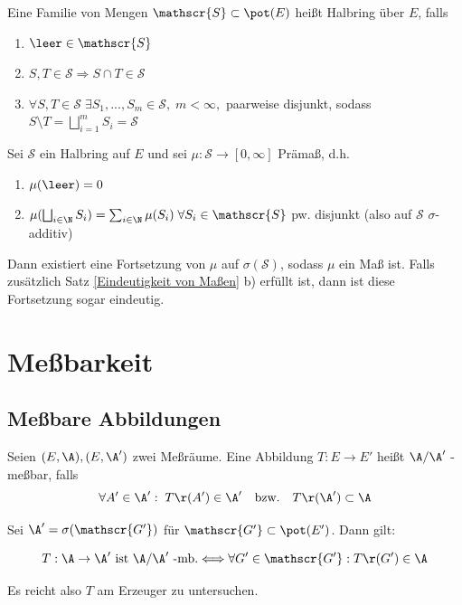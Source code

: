 \documentclass[11pt, a4paper]{article}
\begin{document}
\begin{definition} \label{def:Halbringe}
    Eine Familie von Mengen $\mathscr{S}\subset \pot(E)$ heißt Halbring über $E$, falls 
    \begin{enumerate}
        \item $\leer \in \mathscr{S}$
        \item $S,T\in \mathscr{S} \Rightarrow S\cap T\in \mathscr{S}$
        \item $\forall S,T\in \mathscr{S}\; \exists S_1,...,S_m\in \mathscr{S}, \; m<\infty,$ paarweise disjunkt, sodass $S\setminus T = \bigsqcup_{i=1}^m S_i = \mathscr{S}$
    \end{enumerate}
\end{definition}\bigskip

\begin{theorem}[Carathéodory] \Theorem
Sei $\mathscr{S}$ ein Halbring auf $E$ und sei $\mu: \mathscr{S}\to [0,\infty]$ Prämaß, d.h.
\begin{enumerate}[label = \alph*)]
    \item $\mu(\leer) = 0$
    \item $\mu(\bigsqcup_{i\in\N} S_i) = \sum_{i\in \N} \mu(S_i) \; \forall S_i\in \mathscr{S}$ pw. disjunkt (also auf $\mathscr{S}$ $\sigma$-additiv)
\end{enumerate}
Dann existiert eine Fortsetzung von $\mu$ auf $\sigma(\mathscr{S})$, sodass $\mu$ ein Maß ist. Falls zusätzlich Satz \ref{Eindeutigkeit von Maßen} b) erfüllt ist, dann ist diese Fortsetzung sogar eindeutig.
\end{theorem}




\newpage
\section{Meßbarkeit}

\subsection{Meßbare Abbildungen}
\begin{definition} \Theorem
    Seien $(E,\A), (E,\A')$ zwei Meßräume. Eine Abbildung $T: E \to E'$ heißt $\A / \A'$ -meßbar, falls
    $$\forall A' \in \A': \; T\r(A')\in \A' \quad \text{bzw.} \quad T\r(\A')\subset \A $$
\end{definition}

\begin{lemma}
    Sei $\A'=\sigma(\mathscr{G'})$ für $\mathscr{G'}\subset \pot(E') $. Dann gilt:

    $$T: \A \to \A' \text{ ist $ \A / \A'$ -mb.} \Longleftrightarrow \forall G'\in \mathscr{G'}: T\r(G')\in \A$$

    Es reicht also $T$ am Erzeuger zu untersuchen.
\end{lemma}
\end{document}
